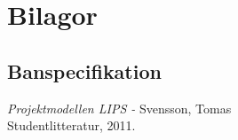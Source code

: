 \documentclass[a4paper,12pt]{article}
\begin{document}
\newpage
\appendix
\section{Bilagor} \label{app:rules}


\subsection{Banspecifikation} \label{app:bana}

\newpage


\begin{thebibliography}{99}
\textit{Projektmodellen LIPS - } Svensson, Tomas
\\Studentlitteratur, 2011.
\end{thebibliography}
\end{document}
